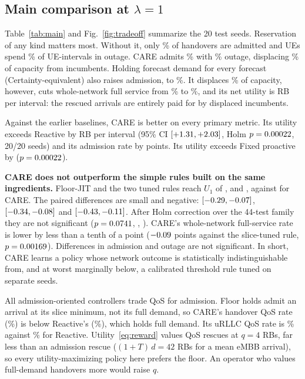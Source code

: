 \documentclass[journal]{IEEEtran}
\begin{document}
\subsection{Main comparison at \texorpdfstring{$\lambda=1$}{lambda = 1}}
Table~\ref{tab:main} and Fig.~\ref{fig:tradeoff} summarize the 20 test seeds. Reservation of any kind matters most. Without it, only \NoResHSR\% of handovers are admitted and UEs spend \NoResOutage\% of UE-intervals in outage. CARE admits \CareHSR\% with \CareOutage\% outage, displacing \CareDisplaced\% of capacity from incumbents. Holding forecast demand for every forecast (Certainty-equivalent) also raises admission, to \CertaintyHSR\%. It displaces \CertaintyDisplaced\% of capacity, however, cuts whole-network full service from \NoResFull\% to \CertaintyFull\%, and its net utility is \CertaintyUtility{} RB per interval: the rescued arrivals are entirely paid for by displaced incumbents.

Against the earlier baselines, CARE is better on every primary metric. Its utility exceeds Reactive by \VsReactiveUtilDiff{} RB per interval (95\% CI $[+1.31,+2.03]$, Holm $p=0.00022$, 20/20 seeds) and its admission rate by \VsReactiveHSRDiff{} points. Its utility exceeds Fixed proactive by \VsFixedUtilDiff{} ($p=0.00022$).

\textbf{CARE does not outperform the simple rules built on the same ingredients.} Floor-JIT and the two tuned rules reach $U_1$ of \FloorJITUtility{}, \TunedUtility{} and \SliceTunedUtility{}, against \CareUtility{} for CARE. The paired differences are small and negative: \VsFloorJITUtilDiff{} $[-0.29,-0.07]$, \VsTunedUtilDiff{} $[-0.34,-0.08]$ and \VsSliceTunedUtilDiff{} $[-0.43,-0.11]$. After Holm correction over the 44-test family they are not significant ($p=0.0741$, \VsTunedUtilP, \VsSliceTunedUtilP). CARE's whole-network full-service rate is lower by less than a tenth of a point ($-0.09$ points against the slice-tuned rule, $p=0.00169$). Differences in admission and outage are not significant. In short, CARE learns a policy whose network outcome is statistically indistinguishable from, and at worst marginally below, a calibrated threshold rule tuned on separate seeds.

All admission-oriented controllers trade QoS for admission. Floor holds admit an arrival at its slice minimum, not its full demand, so CARE's handover QoS rate (\CareQoS\%) is below Reactive's (\ReactiveQoS\%), which holds full demand. Its uRLLC QoS rate is \CareURLLCQoS\% against \ReactiveURLLCQoS\% for Reactive. Utility~\eqref{eq:reward} values QoS rescues at $q=4$ RBs, far less than an admission rescue ($(1+T)\,d=42$ RBs for a mean eMBB arrival), so every utility-maximizing policy here prefers the floor. An operator who values full-demand handovers more would raise $q$.
\end{document}
